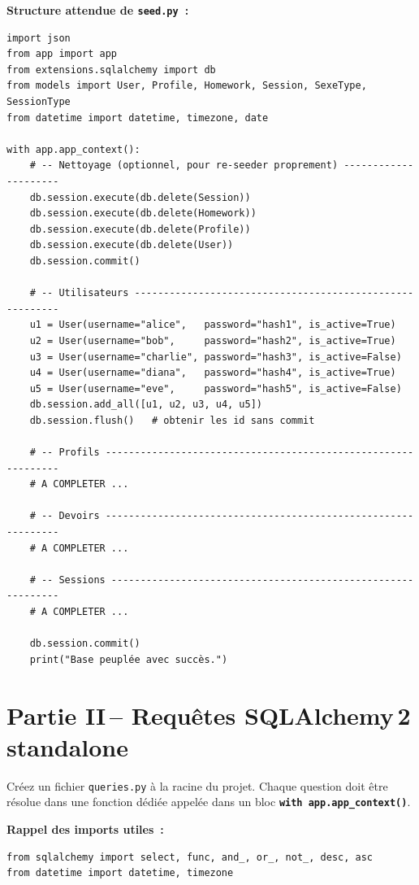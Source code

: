 \documentclass[12pt,a4paper]{article}
\newcommand{\fichier}[1]{\texttt{\textcolor{primary}{#1}}}
\newcommand{\kw}[1]{\texttt{\textbf{#1}}}
\begin{document}
\textbf{Structure attendue de \fichier{seed.py}~:}
\begin{lstlisting}
import json
from app import app
from extensions.sqlalchemy import db
from models import User, Profile, Homework, Session, SexeType, SessionType
from datetime import datetime, timezone, date

with app.app_context():
    # -- Nettoyage (optionnel, pour re-seeder proprement) ---------------------
    db.session.execute(db.delete(Session))
    db.session.execute(db.delete(Homework))
    db.session.execute(db.delete(Profile))
    db.session.execute(db.delete(User))
    db.session.commit()

    # -- Utilisateurs ---------------------------------------------------------
    u1 = User(username="alice",   password="hash1", is_active=True)
    u2 = User(username="bob",     password="hash2", is_active=True)
    u3 = User(username="charlie", password="hash3", is_active=False)
    u4 = User(username="diana",   password="hash4", is_active=True)
    u5 = User(username="eve",     password="hash5", is_active=False)
    db.session.add_all([u1, u2, u3, u4, u5])
    db.session.flush()   # obtenir les id sans commit

    # -- Profils --------------------------------------------------------------
    # A COMPLETER ...

    # -- Devoirs --------------------------------------------------------------
    # A COMPLETER ...

    # -- Sessions -------------------------------------------------------------
    # A COMPLETER ...

    db.session.commit()
    print("Base peuplée avec succès.")
\end{lstlisting}

\section{Partie II\,– Requêtes SQLAlchemy\,2 \og standalone\fg{}}

Créez un fichier \fichier{queries.py} à la racine du projet.
Chaque question doit être résolue dans une fonction dédiée appelée dans un bloc \kw{with app.app\_context()}.

\begin{mdframed}[style=attention]
\textbf{Rappel des imports utiles~:}
\begin{lstlisting}[numbers=none]
from sqlalchemy import select, func, and_, or_, not_, desc, asc
from datetime import datetime, timezone
\end{lstlisting}
\end{mdframed}
\end{document}
